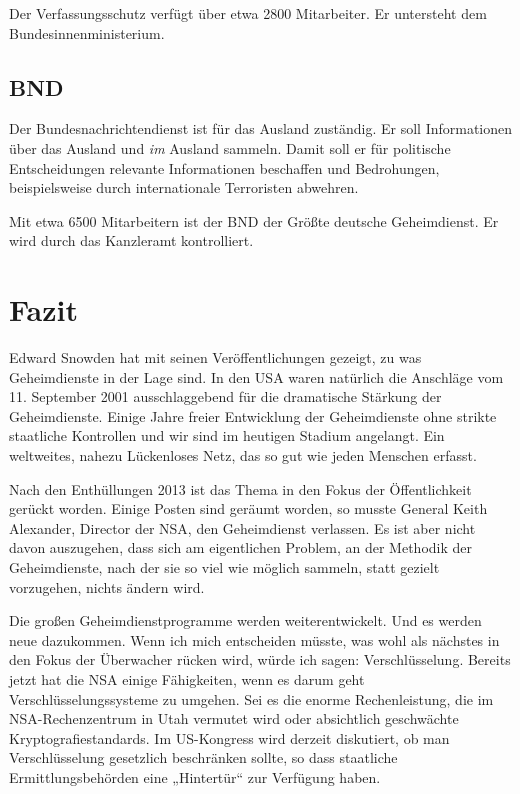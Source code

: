 \documentclass[12pt,a4paper]{scrartcl}
\begin{document}
Der Verfassungsschutz verfügt über etwa 2800 Mitarbeiter. Er untersteht dem Bundesinnenministerium.\cite{ard_geheimdienste}

\subsection{BND}
Der Bundesnachrichtendienst ist für das Ausland zuständig. Er soll Informationen über das Ausland und \emph{im} Ausland sammeln. Damit soll er für politische Entscheidungen relevante Informationen beschaffen und Bedrohungen, beispielsweise durch internationale Terroristen abwehren.\cite{ard_geheimdienste}

Mit etwa 6500 Mitarbeitern ist der BND der Größte deutsche Geheimdienst. Er wird durch das Kanzleramt kontrolliert.\cite{ard_geheimdienste}

\section{Fazit}
Edward Snowden hat mit seinen Veröffentlichungen gezeigt, zu was Geheimdienste in der Lage sind. In den USA waren natürlich die Anschläge vom 11. September 2001 ausschlaggebend für die dramatische Stärkung der Geheimdienste. Einige Jahre freier Entwicklung der Geheimdienste ohne strikte staatliche Kontrollen und wir sind im heutigen Stadium angelangt. Ein weltweites, nahezu Lückenloses Netz, das so gut wie jeden Menschen erfasst.

Nach den Enthüllungen 2013 ist das Thema in den Fokus der Öffentlichkeit gerückt worden. Einige Posten sind geräumt worden, so musste General Keith Alexander, Director der NSA, den Geheimdienst verlassen. Es ist aber nicht davon auszugehen, dass sich am eigentlichen Problem, an der Methodik der Geheimdienste, nach der sie so viel wie möglich sammeln, statt gezielt vorzugehen, nichts ändern wird.

Die großen Geheimdienstprogramme werden weiterentwickelt. Und es werden neue dazukommen. Wenn ich mich entscheiden müsste, was wohl als nächstes in den Fokus der Überwacher rücken wird, würde ich sagen: Verschlüsselung. Bereits jetzt hat die NSA einige Fähigkeiten, wenn es darum geht Verschlüsselungssysteme zu umgehen. Sei es die enorme Rechenleistung, die im NSA-Rechenzentrum in Utah vermutet wird oder absichtlich geschwächte Kryptografiestandards. Im US-Kongress wird derzeit diskutiert, ob man Verschlüsselung gesetzlich beschränken sollte, so dass staatliche Ermittlungsbehörden eine „Hintertür“ zur Verfügung haben.
\end{document}

